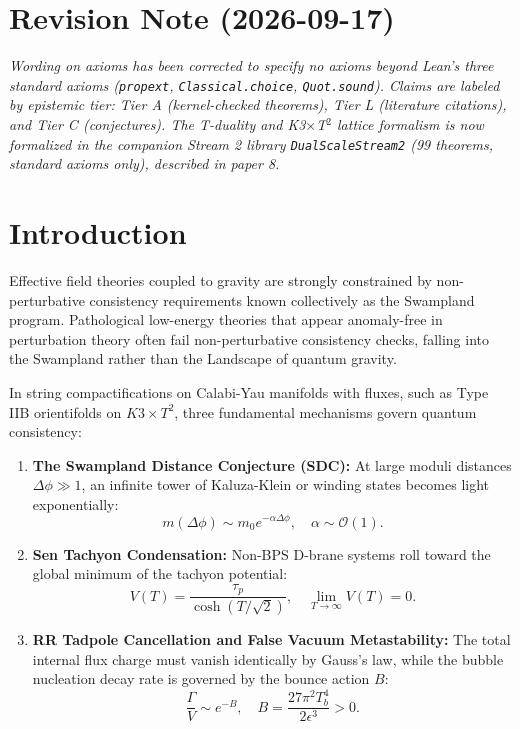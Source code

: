 \documentclass[11pt,a4paper]{article}
\begin{document}
\section*{Revision Note (2026-09-17)}
\textit{Wording on axioms has been corrected to specify no axioms beyond Lean's three standard axioms (\texttt{propext}, \texttt{Classical.choice}, \texttt{Quot.sound}). Claims are labeled by epistemic tier: Tier A (kernel-checked theorems), Tier L (literature citations), and Tier C (conjectures). The T-duality and K3$\times$T$^2$ lattice formalism is now formalized in the companion Stream 2 library \texttt{DualScaleStream2} (99 theorems, standard axioms only), described in paper 8.}

\section{Introduction}
Effective field theories coupled to gravity are strongly constrained by non-perturbative consistency requirements known collectively as the Swampland program. Pathological low-energy theories that appear anomaly-free in perturbation theory often fail non-perturbative consistency checks, falling into the Swampland rather than the Landscape of quantum gravity.

In string compactifications on Calabi-Yau manifolds with fluxes, such as Type IIB orientifolds on $K3 \times T^2$, three fundamental mechanisms govern quantum consistency:
\begin{enumerate}
    \item \textbf{The Swampland Distance Conjecture (SDC):} At large moduli distances $\Delta \phi \gg 1$, an infinite tower of Kaluza-Klein or winding states becomes light exponentially:
    \begin{equation}
        m(\Delta \phi) \sim m_0 e^{-\alpha \Delta \phi}, \quad \alpha \sim \mathcal{O}(1).
    \end{equation}
    \item \textbf{Sen Tachyon Condensation:} Non-BPS D-brane systems roll toward the global minimum of the tachyon potential:
    \begin{equation}
        V(T) = \frac{\tau_p}{\cosh(T / \sqrt{2})}, \quad \lim_{T \to \infty} V(T) = 0.
    \end{equation}
    \item \textbf{RR Tadpole Cancellation and False Vacuum Metastability:} The total internal flux charge must vanish identically by Gauss's law, while the bubble nucleation decay rate is governed by the bounce action $B$:
    \begin{equation}
        \frac{\Gamma}{V} \sim e^{-B}, \quad B = \frac{27 \pi^2 T_b^4}{2 \epsilon^3} > 0.
    \end{equation}
\end{enumerate}
\end{document}
